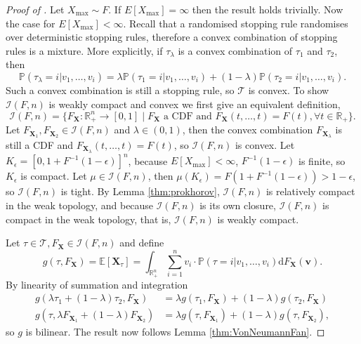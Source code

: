 \documentclass[11pt,a4paper]{article}
\numberwithin{equation}{section}
\newenvironment{cleverproof}[1]
  {\begin{proof}[Proof of \Cref{#1}]}
  {\end{proof}}
\begin{document}
\begin{cleverproof}{thm:minimax-equality}
    Let $X_{\max}\sim F$. If $E[X_{\max}]=\infty$ then the result holds trivially. Now the case for $E[X_{\max}]<\infty$.
    Recall that a randomised stopping rule randomises over deterministic stopping rules, therefore a convex combination of stopping rules is a mixture. More explicitly, if $\tau_\lambda$ is a convex combination of $\tau_1$ and $\tau_2$, then
    $$
    \mathbb{P}(\tau_\lambda=i|v_1,\dots,v_i)=\lambda\mathbb{P}(\tau_1=i|v_1,\dots,v_i)+(1-\lambda)\mathbb{P}(\tau_2=i|v_1,\dots,v_i).
    $$
    Such a convex combination is still a stopping rule, so $\mathcal{T}$ is convex. 
    To show $\mathcal{I}(F,n)$ is weakly compact and convex we first give an equivalent definition,
    $$
    \mathcal{I}(F,n)=\{F_{\boldsymbol{X}}:\mathbb{R}^n_+\to[0,1]\;|\;F_{\boldsymbol{X}}\text{ a CDF and }F_{\boldsymbol{X}}(t,\dots,t)=F(t),\forall t\in\mathbb{R}_+\}.
    $$
    Let $F_{\boldsymbol{X}_1},F_{\boldsymbol{X}_2}\in\mathcal{I}(F,n)$ and $\lambda\in(0,1)$, then the convex combination $F_{\boldsymbol{X}_\lambda}$ is still a CDF and $F_{\boldsymbol{X}_\lambda}(t,\dots,t)=F(t)$, so $\mathcal{I}(F,n)$ is convex.    
    Let $K_\epsilon=[0,1+F^{-1}(1-\epsilon)]^n$, because $E[X_{\max}]<\infty$, $F^{-1}(1-\epsilon)$ is finite, so $K_\epsilon$ is compact. Let $\mu\in\mathcal{I}(F,n)$, then $\mu(K_\epsilon)=F(1+F^{-1}(1-\epsilon))>1-\epsilon$, so $\mathcal{I}(F,n)$ is tight. 
    By Lemma \ref{thm:prokhorov}, $\mathcal{I}(F,n)$ is relatively compact in the weak topology, and because $\mathcal{I}(F,n)$ is its own closure, $\mathcal{I}(F,n)$ is compact in the weak topology, that is, $\mathcal{I}(F,n)$ is weakly compact.
    
    \noindent Let $\tau\in\mathcal{T},F_{\boldsymbol{X}}\in\mathcal{I}(F,n)$ and define $$g(\tau,F_{\boldsymbol{X}})=\mathbb{E}[\boldsymbol{X}_{\tau}]=\int_{\mathbb{R}_+^n}\sum_{i=1}^nv_i\cdot\mathbb{P}(\tau=i|v_1,\dots,v_i)\mathrm{d}F_{\boldsymbol{X}}(\boldsymbol{v}).$$ By linearity of summation and integration 
    \begin{align*}
        g(\lambda\tau_1+(1-\lambda)\tau_2,F_{\boldsymbol{X}})&=\lambda g(\tau_1,F_{\boldsymbol{X}}) + (1-\lambda)g(\tau_2,F_{\boldsymbol{X}})\\
        g(\tau,\lambda F_{\boldsymbol{X}_1}+(1-\lambda) F_{\boldsymbol{X}_2})&=\lambda g(\tau,F_{\boldsymbol{X}_1}) + (1-\lambda)g(\tau,F_{\boldsymbol{X}_2}),
    \end{align*}
    so $g$ is bilinear. The result now follows Lemma \ref{thm:VonNeumannFan}.
\end{cleverproof}
\end{document}
